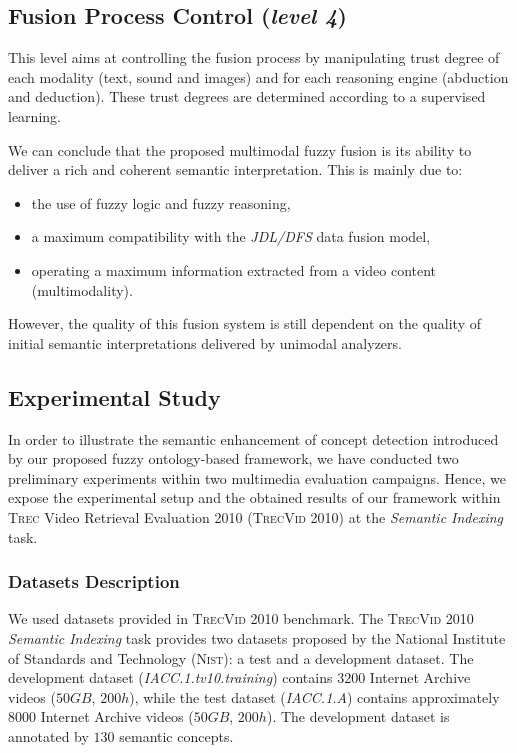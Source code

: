 	\subsection{Fusion Process Control (\emph{level 4})}
		This level aims at controlling the fusion process by manipulating trust  degree of each modality 
		(text, sound and images) and for each reasoning  engine (abduction and deduction). These trust degrees 
		are determined according to a supervised learning.

	We can conclude that the proposed multimodal fuzzy fusion is   its ability to deliver 
	a rich and coherent semantic interpretation. This is mainly due to:
	\begin{itemize}	
		\item the use of fuzzy logic and fuzzy reasoning,
		\item a  maximum compatibility with the \emph{JDL/DFS} data fusion model,
		\item operating a maximum information  extracted from a video content (multimodality).
	\end{itemize}
	
	However, the quality of this fusion system is still dependent on the quality of initial semantic interpretations delivered by 
	unimodal analyzers.

	
	\subsection{Experimental Study}
		In order to illustrate the semantic enhancement of concept detection introduced 
		by our proposed fuzzy  ontology-based framework, we have conducted two preliminary experiments 
		within two 
		multimedia evaluation campaigns. Hence, we expose the experimental setup and the 
		obtained results of our framework within \textsc{Trec} Video Retrieval Evaluation 2010 (\textsc{TrecVid 2010}) 
		\citep{Over2010} at the \textit{Semantic Indexing} task.
		

		\subsubsection{Datasets Description}
		We used datasets provided 
		in \textsc{TrecVid 2010} benchmark. The \textsc{TrecVid 2010} \textit{Semantic Indexing} task provides 
		two datasets proposed by the National Institute of Standards and Technology (\textsc{Nist}): 
		a test and a development dataset. 
		The development dataset (\emph{IACC.1.tv10.training}) contains $3200$ Internet Archive videos 
		($50GB$, $200 h$), while the test dataset (\emph{IACC.1.A}) contains approximately $8000$ Internet 
		Archive videos ($50GB$, $200 h$). The development dataset is annotated by $130$ semantic concepts.


